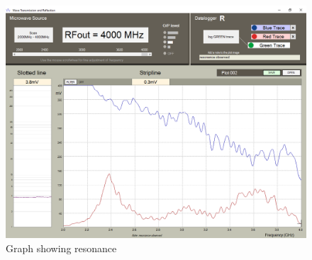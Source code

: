 \documentclass[12pt]{article}
\begin{document}
\begin{figure}[h]
    \centering
    \includegraphics[width=1\textwidth]{Plot_2.png}
    \caption{Graph showing resonance}
    \label{fig:phase_space}
\end{figure}
\end{document}
